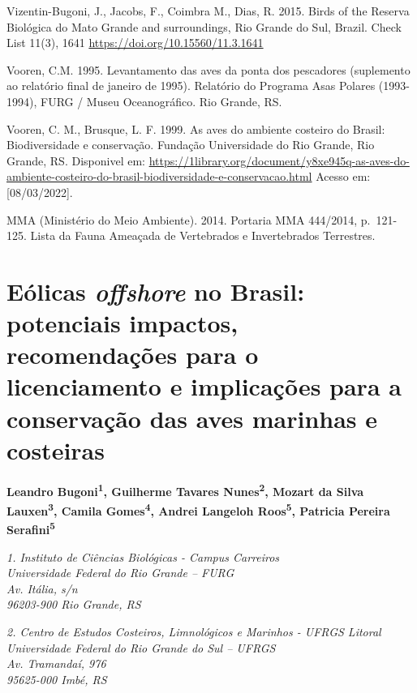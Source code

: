 \documentclass[
  oneside]{scrbook}
\begin{document}
Vizentin-Bugoni, J., Jacobs, F., Coimbra M., Dias, R. 2015. Birds of the Reserva Biológica do Mato Grande and surroundings, Rio Grande do Sul, Brazil. Check List 11(3), 1641 \url{https://doi.org/10.15560/11.3.1641}

Vooren, C.M. 1995. Levantamento das aves da ponta dos pescadores (suplemento ao relatório final de janeiro de 1995). Relatório do Programa Asas Polares (1993-1994), FURG / Museu Oceanográfico. Rio Grande, RS.

Vooren, C. M., Brusque, L. F. 1999. As aves do ambiente costeiro do Brasil: Biodiversidade e conservação. Fundação Universidade do Rio Grande, Rio Grande, RS. Disponivel em: \url{https://1library.org/document/y8xe945q-as-aves-do-ambiente-costeiro-do-brasil-biodiversidade-e-conservacao.html} Acesso em: {[}08/03/2022{]}.

MMA (Ministério do Meio Ambiente). 2014. Portaria MMA 444/2014, p.~121-125. Lista da Fauna Ameaçada de Vertebrados e Invertebrados Terrestres.

\hypertarget{cap8}{%
\chapter{\texorpdfstring{Eólicas \emph{offshore} no Brasil: potenciais impactos, recomendações para o licenciamento e implicações para a conservação das aves marinhas e costeiras}{Eólicas offshore no Brasil: potenciais impactos, recomendações para o licenciamento e implicações para a conservação das aves marinhas e costeiras}}\label{cap8}}


\pagestyle{headings}

\textbf{Leandro Bugoni\textsuperscript{1}, Guilherme Tavares Nunes\textsuperscript{2}, Mozart da Silva Lauxen\textsuperscript{3}, Camila Gomes\textsuperscript{4}, Andrei Langeloh Roos\textsuperscript{5}, Patricia Pereira Serafini\textsuperscript{5}}

\emph{1. Instituto de Ciências Biológicas - Campus Carreiros}\\
\emph{Universidade Federal do Rio Grande -- FURG}\\
\emph{Av. Itália, s/n}\\
\emph{96203-900 Rio Grande, RS}

\emph{2. Centro de Estudos Costeiros, Limnológicos e Marinhos - UFRGS Litoral}\\
\emph{Universidade Federal do Rio Grande do Sul -- UFRGS}\\
\emph{Av. Tramandaí, 976}\\
\emph{95625-000 Imbé, RS}
\end{document}
